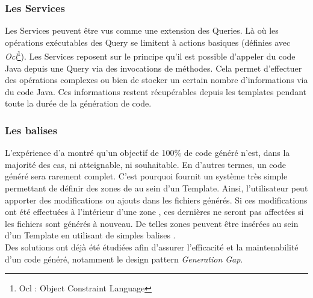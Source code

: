 \subsubsection{Les Services}

Les Services peuvent être vus comme une extension des Queries. Là où les opérations exécutables des Query se limitent à actions basiques (définies avec \textit{Ocl}\footnote{Ocl : Object Constraint Language}). Les Services reposent sur le principe qu'il est possible d'appeler du code Java depuis une Query via des invocations de méthodes. Cela permet d'effectuer des opérations complexes ou bien de stocker un certain nombre d'informations via du code Java. Ces informations restent récupérables depuis les templates pendant toute la durée de la génération de code.

\subsubsection{Les balises }

L'expérience d'\kwobeo a montré qu'un objectif de 100\% de code généré n'est, dans la majorité des cas, ni atteignable, ni souhaitable.
En d'autres termes, un code généré sera rarement complet. C'est pourquoi \kwacceleo fournit un système très simple permettant de définir des zones de  au sein d'un Template. Ainsi, l'utilisateur peut apporter des modifications ou ajouts dans les fichiers générés. Si ces modifications ont été effectuées à l'intérieur d'une zone , ces dernières ne seront pas affectées si les fichiers sont générés à nouveau.
De telles zones peuvent être insérées au sein d'un Template en utilisant de simples balises \guim{\textit{\textbf{[protected]}}}.
\\
Des solutions ont déjà été étudiées afin d'assurer l'efficacité et la maintenabilité d'un code généré, notamment le design pattern \textit{Generation Gap}\cite{gen_gap}.

